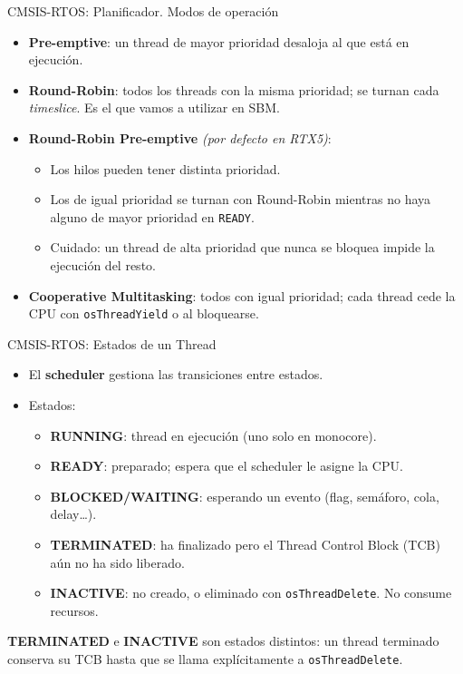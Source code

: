 \begin{frame}{CMSIS-RTOS: Planificador. Modos de operación}
    \begin{itemize}
        \item \textbf{Pre-emptive}: un thread de mayor prioridad desaloja
              al que está en ejecución.
        \item \textbf{Round-Robin}: todos los threads con la misma
              prioridad; se turnan cada \emph{timeslice}. Es el que vamos a utilizar en SBM.
        \item \textbf{Round-Robin Pre-emptive} \emph{(por defecto en RTX5)}:
            \begin{itemize}
                \item Los hilos pueden tener distinta prioridad.
                \item Los de igual prioridad se turnan con Round-Robin mientras no haya alguno de mayor prioridad en \texttt{READY}.
                \item \alert{Cuidado}: un thread de alta prioridad que nunca se bloquea impide la ejecución del resto.
            \end{itemize}
        \item \textbf{Cooperative Multitasking}: todos con igual prioridad; cada thread cede la CPU con \texttt{osThreadYield} o al
              bloquearse.
    \end{itemize}
\end{frame}

\begin{frame}{CMSIS-RTOS: Estados de un Thread}
    \begin{itemize}
        \item El \textbf{scheduler} gestiona las transiciones entre estados.
        \item Estados:
            \begin{itemize}
                \item \textbf{RUNNING}: thread en ejecución                  (uno solo en monocore).
                \item \textbf{READY}: preparado; espera que el scheduler                      le asigne la CPU.
                \item \textbf{BLOCKED/WAITING}: esperando un evento          (flag, semáforo, cola, delay\ldots).
                \item \textbf{TERMINATED}: ha finalizado pero el Thread Control Block (TCB) aún no ha sido liberado.
                \item \textbf{INACTIVE}: no creado, o eliminado con
                      \texttt{osThreadDelete}. No consume recursos.
            \end{itemize}
    \end{itemize}
    \vspace{4pt}
    {\footnotesize \textbf{TERMINATED} e \textbf{INACTIVE} son estados
     distintos: un thread terminado conserva su TCB hasta que se llama
     explícitamente a \texttt{osThreadDelete}.}
\end{frame}

